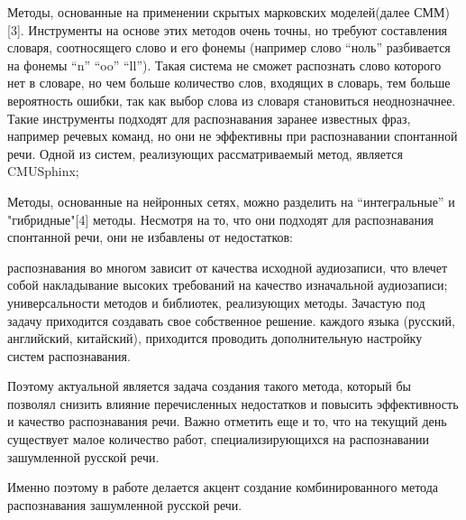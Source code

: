 \documentclass[conference]{IEEEtran}
\begin{document}
    Методы, основанные на применении скрытых марковских моделей(далее СММ) [3].
    Инструменты на основе этих методов очень точны, но требуют составления словаря, соотносящего слово и его фонемы (например слово “ноль” разбивается на фонемы “n” “oo” “ll”).
    Такая система не сможет распознать слово которого нет в словаре, но чем больше количество слов, входящих в словарь, тем больше вероятность ошибки, так как выбор слова из словаря становиться неоднозначнее.
    Такие инструменты подходят для распознавания заранее известных фраз, например речевых команд, но они не эффективны при распознавании спонтанной речи.
    Одной из систем, реализующих рассматриваемый метод, является CMUSphinx;

    Методы, основанные на нейронных сетях, можно разделить на “интегральные” и "гибридные"[4] методы.
    Несмотря на то, что они подходят для распознавания спонтанной речи, они не избавлены от недостатков:

    \begin{itemize}
         распознавания во многом зависит от качества исходной аудиозаписи, что влечет собой накладывание высоких требований на качество изначальной аудиозаписи;
         универсальности методов и библиотек, реализующих методы.
        Зачастую под задачу приходится создавать свое собственное решение.
         каждого языка (русский, английский, китайский), приходится проводить дополнительную настройку систем распознавания.
    \end{itemize}
    Поэтому актуальной является задача создания такого метода,
    который бы позволял снизить влияние перечисленных недостатков
    и повысить эффективность и качество распознавания речи.
    Важно отметить еще и то, что на текущий день существует малое количество работ,
    специализирующихся на распознавании зашумленной русской речи.

    Именно поэтому в работе делается акцент создание комбинированного метода распознавания зашумленной русской речи.
\end{document}
